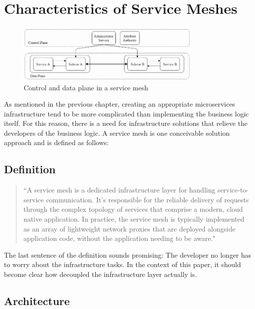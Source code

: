 \section{Characteristics of Service Meshes}

\begin{figure}
    \centering
    \includegraphics[width=0.8\textwidth]{img/mesh_detailed.JPG}
    \caption{Control and data plane in a service mesh\cite{sm4}}
    \label{fig:detailed mesh}
\end{figure}

As mentioned in the previous chapter, creating an appropriate microservices infrastructure tend to be more complicated than implementing the business logic itself. For this reason, there is a need for infrastructure solutions that relieve the developers of the business logic. A service mesh is one conceivable solution approach and is defined as follows:

\subsection{Definition}

\begin{quote}
``A service mesh is a dedicated infrastructure layer for handling service-to-service communication. It’s responsible for the reliable delivery of requests through the complex topology of services that comprise a modern, cloud native application.
In practice, the service mesh is typically implemented as an array of lightweight network proxies that are deployed alongside application code, without the application needing to be aware." \cite[p. 123]{sm1}
\end{quote}

The last sentence of the definition sounds promising: The developer no longer has to worry about the infrastructure tasks. In the context of this paper, it should become clear how decoupled the infrastructure layer actually is.

\subsection{Architecture}

